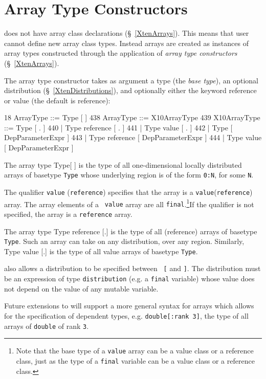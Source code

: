 \section{Array Type Constructors}
\label{ArrayypeConstructors}

{}\XtenCurrVer{} does not have array class declarations
(\S~\ref{XtenArrays}). This means that user cannot define new array
class types. Instead arrays are created as instances of array types
constructed through the application of {\em array type constructors}
(\S~\ref{XtenArrays}).

The array type constructor takes as argument a type (the {\em base
type}), an optional distribution (\S~\ref{XtenDistributions}), and
optionally either the keyword {\cf reference} or {\cf value} (the
default is reference):
\begin{x10}
18    ArrayType ::= Type [ ]
438   ArrayType ::= X10ArrayType
439   X10ArrayType ::= Type [ . ]
440     | Type reference [ . ]
441     | Type value [ . ]
442     | Type [ DepParameterExpr ]
443     | Type reference [ DepParameterExpr ]
444     | Type value [ DepParameterExpr ]
\end{x10}

The array type {\cf Type[ ] } is the type of all
one-dimensional locally distributed arrays of basetype {\tt Type}
whose underlying region is of the form {\tt 0:N}, for some {\tt N}.

The qualifier {\tt value} ({\tt reference}) specifies that the array
is a {\tt value}({\tt reference}) array. The array elements of a {\tt
value} array are all {\tt final}.\footnote{Note that the base type of a {\tt value} array can be a value class or a reference class, just as the 
type of a {\tt final} variable can be a value class or a reference class.
}If the qualifier is not specified,
the array is a {\tt reference} array.

The array type {\cf Type reference [.]} is the type of all (reference)
arrays of basetype {\tt Type}. Such an array can take on any
distribution, over any region. Similarly, {\cf Type value [.]} is the
type of all value arrays of basetype {\tt Type}.

\XtenCurrVer{} also allows a distribution to be specified between {\tt
[} and {\tt ]}. The distribution must be an expression of type
{\tt distribution} (e.g.{} a {\tt final} variable) whose
value does not depend on the value of any mutable variable.

Future extensions to \Xten{} will support a more general syntax for
arrays which allows for the specification of dependent types, 
e.g.{} {\tt double[:rank 3]}, the type of all arrays of 
{\tt double} of rank {\tt 3}.



